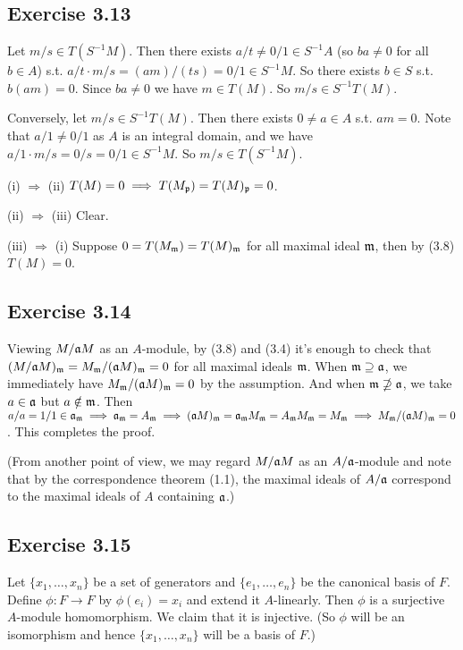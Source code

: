 \documentclass[../A&M.tex]{subfiles}
\begin{document}
\subsection*{Exercise 3.13}

Let $m/s \in T(S^{-1}M)$. Then there exists $a/t \neq 0/1 \in S^{-1}A$ (so $ba\neq 0$ for all $b\in A$) s.t. $a/t \cdot m/s = (am)/(ts) = 0/1 \in S^{-1}M$. So there exists $b \in S$ s.t. $b(am) = 0$. Since $ba \neq 0$ we have $m \in T(M)$. So $m/s \in S^{-1}T(M)$.

Conversely, let $m/s \in S^{-1}T(M)$. Then there exists $0 \neq a \in A$ s.t. $am=0$. Note that $a/1 \neq 0/1$ as $A$ is an integral domain, and we have $a/1 \cdot m/s = 0/s = 0/1 \in S^{-1}M$. So $m/s \in T(S^{-1}M)$.

(i) $\Rightarrow$ (ii) $T(M)=0 \implies T(M_{\mathfrak{p}}) = T(M)_{\mathfrak{p}} = 0$.

(ii) $\Rightarrow$ (iii) Clear.

(iii) $\Rightarrow$ (i) Suppose $0 = T(M_{\mathfrak{m}}) = T(M)_{\mathfrak{m}}$ for all maximal ideal $\mathfrak{m}$, then by (3.8) $T(M)=0$.

\subsection*{Exercise 3.14}

Viewing $M/\mathfrak{a} M$ as an $A$-module, by (3.8) and (3.4) it's enough to check that $(M/\mathfrak{a} M)_{\mathfrak{m}} = M_{\mathfrak{m}}/(\mathfrak{a} M)_{\mathfrak{m}} = 0$ for all maximal ideals $\mathfrak{m}$. When $\mathfrak{m} \supseteq \mathfrak{a}$, we immediately have $M_{\mathfrak{m}}/(\mathfrak{a} M)_{\mathfrak{m}} = 0$ by the assumption. And when $\mathfrak{m} \nsupseteq \mathfrak{a}$, we take $a\in\mathfrak{a}$ but $a \notin \mathfrak{m}$. Then $a/a = 1/1 \in \mathfrak{a}_{\mathfrak{m}} \implies \mathfrak{a}_{\mathfrak{m}} = A_{\mathfrak{m}} \implies (\mathfrak{a} M)_{\mathfrak{m}} = \mathfrak{a}_{\mathfrak{m}} M_{\mathfrak{m}} = A_{\mathfrak{m}} M_{\mathfrak{m}} = M_{\mathfrak{m}} \implies M_{\mathfrak{m}}/(\mathfrak{a} M)_{\mathfrak{m}} = 0$. This completes the proof.

(From another point of view, we may regard $M/\mathfrak{a} M$ as an $A/\mathfrak{a}$-module and note that by the correspondence theorem (1.1), the maximal ideals of $A/\mathfrak{a}$ correspond to the maximal ideals of $A$ containing $\mathfrak{a}$.)

\subsection*{Exercise 3.15}

Let $\{x_1,\ldots,x_n\}$ be a set of generators and $\{e_1,\ldots,e_n\}$ be the canonical basis of $F$. Define $\phi: F\to F$ by $\phi(e_i) = x_i$ and extend it $A$-linearly. Then $\phi$ is a surjective $A$-module homomorphism. We claim that it is injective. (So $\phi$ will be an isomorphism and hence $\{x_1,\ldots,x_n\}$ will be a basis of $F$.)
\end{document}
